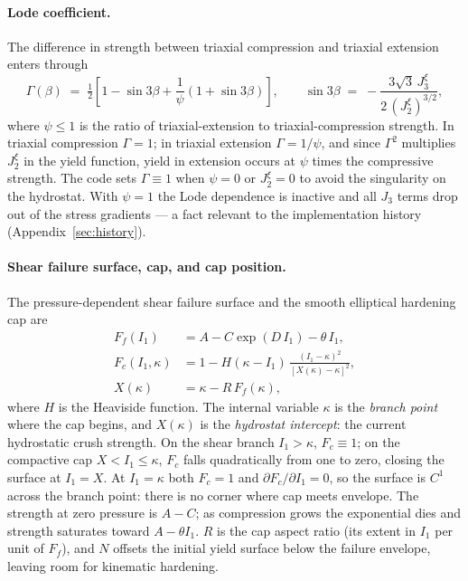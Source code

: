 \documentclass[12pt]{article}
\begin{document}
\paragraph{Lode coefficient.}
The difference in strength between triaxial compression and triaxial
extension enters through
\citep[Eqs.~34--36]{Sun.Chen.Ostien:2014}
\begin{equation}
  \Gamma(\beta) \;=\;
    \tfrac{1}{2}\left[
      1 - \sin 3\beta
    + \frac{1}{\psi}\left(1 + \sin 3\beta\right)
    \right],
  \qquad
  \sin 3\beta \;=\; -\frac{3\sqrt{3}\,J_3^\xi}{2\,(J_2^\xi)^{3/2}},
  \label{eq:Gamma}
\end{equation}
where $\psi \le 1$ is the ratio of triaxial-extension to
triaxial-compression strength. In triaxial compression $\Gamma = 1$;
in triaxial extension $\Gamma = 1/\psi$, and since $\Gamma^2$
multiplies $J_2^\xi$ in the yield function, yield in extension occurs
at $\psi$ times the compressive strength. The code sets
$\Gamma \equiv 1$ when $\psi = 0$ or $J_2^\xi = 0$ to avoid the
singularity on the hydrostat. With $\psi = 1$ the Lode dependence is
inactive and all $J_3$ terms drop out of the stress gradients ---
a fact relevant to the implementation history
(Appendix~\ref{sec:history}).

\paragraph{Shear failure surface, cap, and cap position.}
The pressure-dependent shear failure surface and the smooth
elliptical hardening cap
\citep[Eqs.~32, 37--38]{Sun.Chen.Ostien:2014} are
\begin{align}
  F_f(I_1) &= A - C \exp(D\,I_1) - \theta\,I_1,
             \label{eq:Ff}\\
  F_c(I_1,\kappa) &=
    1 - H(\kappa - I_1)\,\frac{(I_1 - \kappa)^2}{[X(\kappa) - \kappa]^2},
             \label{eq:Fc}\\
  X(\kappa) &= \kappa - R\,F_f(\kappa),
             \label{eq:X}
\end{align}
where $H$ is the Heaviside function. The internal variable $\kappa$
is the \emph{branch point} where the cap begins, and $X(\kappa)$ is
the \emph{hydrostat intercept}: the current hydrostatic crush
strength. On the shear branch $I_1 > \kappa$, $F_c \equiv 1$; on the
compactive cap $X < I_1 \le \kappa$, $F_c$ falls quadratically from
one to zero, closing the surface at $I_1 = X$. At $I_1 = \kappa$
both $F_c = 1$ and $\partial F_c/\partial I_1 = 0$, so the surface is
$C^1$ across the branch point: there is no corner where cap meets
envelope. The strength at zero pressure is $A - C$; as compression
grows the exponential dies and strength saturates toward
$A - \theta I_1$. $R$ is the cap aspect ratio (its extent in $I_1$
per unit of $F_f$), and $N$ offsets the initial yield surface below
the failure envelope, leaving room for kinematic hardening.
\end{document}
